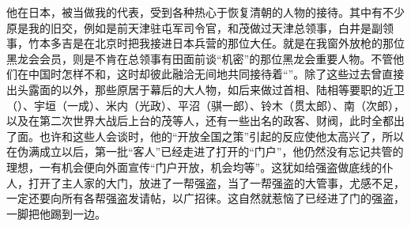 他在日本，被当做我的代表，受到各种热心于恢复清朝的人物的接待。其中有不少原是我的旧交，例如是前天津驻屯军司令官，和茂做过天津总领事，白井是副领事，竹本多吉是在北京时把我接进日本兵营的那位大任。就是在我窗外放枪的那位黑龙会会员，则是不肯在总领事有田面前谈“机密”的那位黑龙会重要人物。不管他们在中国时怎样不和，这时却彼此融洽无间地共同接待着“”。除了这些过去曾直接出头露面的以外，那些原居于幕后的大人物，如后来做过首相、陆相等要职的近卫（）、宇垣（一成）、米内（光政）、平沼（骐一郎）、铃木（贯太郎）、南（次郎），以及在第二次世界大战后上台的茂等人，还有一些出名的政客、财阀，此时全都出了面。也许和这些人会谈时，他的“开放全国之策”引起的反应使他太高兴了，所以在伪满成立以后，第一批“客人”已经走进了打开的“门户”，他仍然没有忘记共管的理想，一有机会便向外面宣传“门户开放，机会均等”。这犹如给强盗做底线的仆人，打开了主人家的大门，放进了一帮强盗，当了一帮强盗的大管事，尤感不足，一定还要向所有各帮强盗发请帖，以广招徕。这自然就惹恼了已经进了门的强盗，一脚把他踢到一边。
